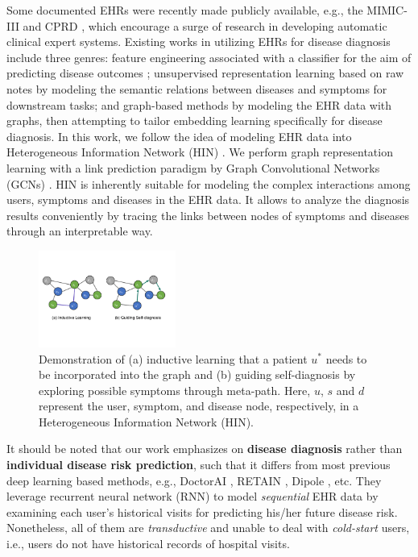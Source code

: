 \documentclass[sigconf]{acmart}
\begin{document}
Some documented EHRs were recently made publicly available, e.g., the MIMIC-III \cite{johnson2016mimic} and CPRD \cite{herrett2015data}, which encourage a surge of research in developing automatic clinical expert systems. Existing works in utilizing EHRs for disease diagnosis include three genres: feature engineering associated with a classifier for the aim of predicting disease outcomes \cite{che2017deep,farhan2016predictive,purushotham2017benchmark,wang2021lifelong}; unsupervised representation learning based on raw notes \cite{choi2016multi,choi2018mime, li2019behrt} by modeling the semantic relations between diseases and symptoms for downstream tasks; and graph-based methods \cite{hosseini2018heteromed, hosseini2019hierarchical} by modeling the EHR data with graphs, then attempting to tailor embedding learning specifically for disease diagnosis. In this work, we follow the idea of modeling EHR data into Heterogeneous Information Network (HIN) \cite{han2010mining}. We perform graph representation learning with a link prediction paradigm by Graph Convolutional Networks (GCNs) \cite{kipf2016semi}. HIN is inherently suitable for modeling the complex interactions among users, symptoms and diseases in the EHR data. It allows to analyze the diagnosis results conveniently by tracing the links between nodes of symptoms and diseases through an interpretable way.
\begin{figure}[t]
\centering
\includegraphics[width=0.40\textwidth]{fig1.pdf}
\caption{Demonstration of (a) inductive learning that a patient $u^*$ needs to be incorporated into the graph and (b) guiding self-diagnosis by exploring possible symptoms through meta-path. Here, $u$, $s$ and $d$ represent the user, symptom, and disease node, respectively, in a Heterogeneous Information Network (HIN). \label{fig:1}}
\end{figure}

It should be noted that our work emphasizes on \textbf{disease diagnosis} rather than \textbf{individual disease risk prediction}, such that it differs from most previous deep learning based methods, e.g., DoctorAI \cite{choi2016doctor}, RETAIN \cite{choi2016retain}, Dipole \cite{ma2017dipole}, etc.  They leverage recurrent neural network (RNN) to model \emph{sequential} EHR data by examining each user's historical visits for predicting his/her future disease risk. Nonetheless, all of them are \emph{transductive} and unable to deal with \emph{cold-start} users, i.e., users do not have historical records of hospital visits. 
\end{document}
